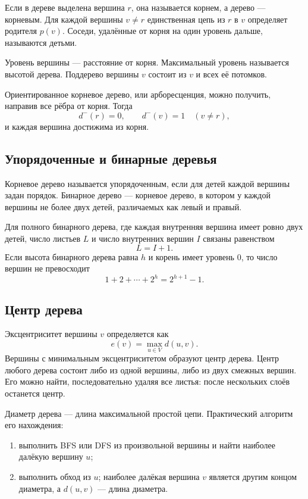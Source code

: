 Если в дереве выделена вершина $r$, она называется корнем, а дерево ---
корневым. Для каждой вершины $v\neq r$ единственная цепь из $r$ в $v$
определяет родителя $p(v)$. Соседи, удалённые от корня на один уровень дальше,
называются детьми.

Уровень вершины --- расстояние от корня. Максимальный уровень называется высотой
дерева. Поддерево вершины $v$ состоит из $v$ и всех её потомков.

Ориентированное корневое дерево, или арборесценция, можно получить, направив все
рёбра от корня. Тогда
\[
    d^-(r)=0,
    \qquad
    d^-(v)=1\quad(v\neq r),
\]
и каждая вершина достижима из корня.

\subsection{Упорядоченные и бинарные деревья}

Корневое дерево называется упорядоченным, если для детей каждой вершины задан
порядок. Бинарное дерево --- корневое дерево, в котором у каждой вершины не более
двух детей, различаемых как левый и правый.

Для полного бинарного дерева, где каждая внутренняя вершина имеет ровно двух
детей, число листьев $L$ и число внутренних вершин $I$ связаны равенством
\[
    L=I+1.
\]
Если высота бинарного дерева равна $h$ и корень имеет уровень $0$, то число
вершин не превосходит
\[
    1+2+\cdots+2^h=2^{h+1}-1.
\]

\subsection{Центр дерева}

Эксцентриситет вершины $v$ определяется как
\[
    e(v)=\max_{u\in V}d(u,v).
\]
Вершины с минимальным эксцентриситетом образуют центр дерева. Центр любого дерева
состоит либо из одной вершины, либо из двух смежных вершин. Его можно найти,
последовательно удаляя все листья: после нескольких слоёв останется центр.

Диаметр дерева --- длина максимальной простой цепи. Практический алгоритм его
нахождения:
\begin{enumerate}
    \item выполнить BFS или DFS из произвольной вершины и найти наиболее далёкую
          вершину $u$;
    \item выполнить обход из $u$; наиболее далёкая вершина $v$ является другим
          концом диаметра, а $d(u,v)$ --- длина диаметра.
\end{enumerate}

